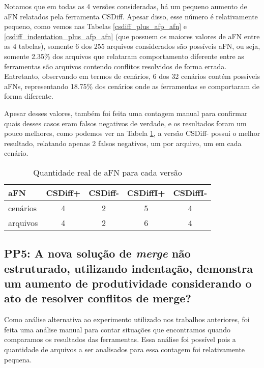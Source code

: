 Notamos que em todas as 4 versões consideradas, há um pequeno aumento de aFN relatados pela ferramenta CSDiff. Apesar disso, esse
número é relativamente pequeno, como vemos nas Tabelas \ref{csdiff_plus_afp_afn} e \ref{csdiff_indentation_plus_afp_afn} (que
possuem os maiores valores de aFN entre as 4 tabelas), somente 6 dos 255 arquivos considerados são possíveis aFN, ou seja, somente
2.35\% dos arquivos que relataram comportamento diferente entre as ferramentas são arquivos contendo
conflitos resolvidos de forma errada. Entretanto, observando em termos de cenários, 6 dos 32 cenários contém possíveis aFNs,
representando 18.75\% dos cenários onde as ferramentas se comportaram de forma diferente.

Apesar desses valores, também foi feita uma contagem manual para confirmar quais desses casos eram falsos negativos de verdade,
e os resultados foram um pouco melhores, como podemos ver na Tabela \ref{tabela_afn_final}, a versão CSDiff- possui o melhor
resultado, relatando apenas 2 falsos negativos, um por arquivo, um em cada cenário.
\begin{table}[ht]
	\begin{center}
		\begin{tabular}{|l|c|c|c|c|}
			\hline
			\textbf{aFN} & \textbf{CSDiff+} & \textbf{CSDiff-} & \textbf{CSDiffI+} & \textbf{CSDiffI-} \\
			\hline
			cenários     & 4                & 2                & 5                 & 4                 \\
			arquivos     & 4                & 2                & 6                 & 4                 \\
			\hline
		\end{tabular}
	\end{center}
	\caption{Quantidade real de aFN para cada versão}\label{tabela_afn_final}
\end{table}
\subsection{PP5: A nova solução de \emph{merge} não estruturado, utilizando indentação,
	demonstra um aumento de produtividade considerando o ato de resolver conflitos de merge?}
Como análise alternativa ao experimento utilizado nos trabalhos anteriores, foi feita uma análise manual para contar
situações que encontramos quando comparamos os resultados das ferramentas. Essa análise foi possível pois a quantidade de
arquivos a ser analisados para essa contagem foi relativamente pequena.

